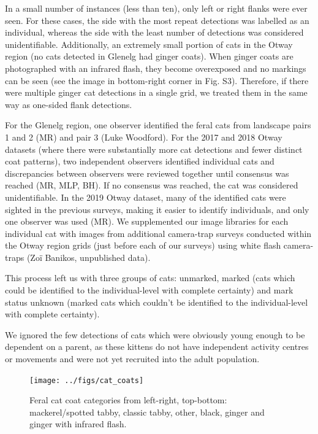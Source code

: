 \documentclass[preprint, 3p, authoryear]{elsarticle} %
\begin{document}
In a small number of instances (less than ten), only left or right flanks were ever seen. For these cases, the side with the most repeat detections was labelled as an individual, whereas the side with the least number of detections was considered unidentifiable. Additionally, an extremely small portion of cats in the Otway region (no cats detected in Glenelg had ginger coats). When ginger coats are photographed with an infrared flash, they become overexposed and no markings can be seen (see the image in bottom-right corner in Fig. S3). Therefore, if there were multiple ginger cat detections in a single grid, we treated them in the same way as one-sided flank detections.

For the Glenelg region, one observer identified the feral cats from landscape pairs 1 and 2 (MR) and pair 3 (Luke Woodford). For the 2017 and 2018 Otway datasets (where there were substantially more cat detections and fewer distinct coat patterns), two independent observers identified individual cats and discrepancies between observers were reviewed together until consensus was reached (MR, MLP, BH). If no consensus was reached, the cat was considered unidentifiable. In the 2019 Otway dataset, many of the identified cats were sighted in the previous surveys, making it easier to identify individuals, and only one observer was used (MR). We supplemented our image libraries for each individual cat with images from additional camera-trap surveys conducted within the Otway region grids (just before each of our surveys) using white flash camera-traps (Zoï Banikos, unpublished data).

This process left us with three groups of cats: unmarked, marked (cats which could be identified to the individual-level with complete certainty) and mark status unknown (marked cats which couldn't be identified to the individual-level with complete certainty).

We ignored the few detections of cats which were obviously young enough to be dependent on a parent, as these kittens do not have independent activity centres or movements and were not yet recruited into the adult population.

\newpage

\begin{figure}

{\centering \texttt{[image: ../figs/cat\_coats]} 

}

\caption{Feral cat coat categories from left-right, top-bottom: mackerel/spotted tabby, classic tabby, other, black, ginger and ginger with infrared flash.}\label{fig:density-cat-photo}
\end{figure}
\end{document}
